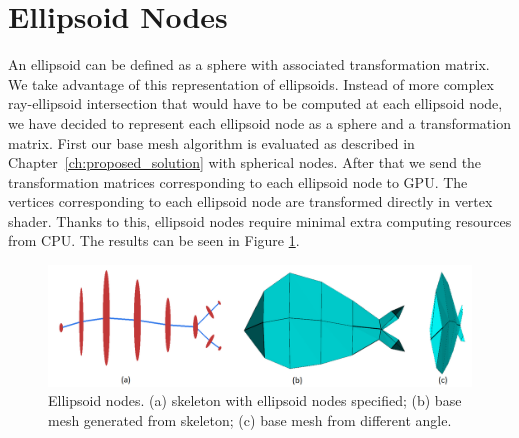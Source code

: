 \section{Ellipsoid Nodes}
An ellipsoid can be defined as a sphere with associated transformation matrix.
We take advantage of this representation of ellipsoids.
Instead of more complex ray-ellipsoid intersection that would have to be computed at each ellipsoid node, we have decided to represent each ellipsoid node as a sphere and a transformation matrix.
First our base mesh algorithm is evaluated as described in Chapter~\ref{ch:proposed_solution} with spherical nodes.
After that we send the transformation matrices corresponding to each ellipsoid node to GPU.
The vertices corresponding to each ellipsoid node are transformed directly in vertex shader.
Thanks to this, ellipsoid nodes require minimal extra computing resources from CPU.
The results can be seen in Figure \ref{fig:ellipsoid_ilu}.

\begin{figure}[ht]
    \centering
    \includegraphics[width=\linewidth]{images/ellipsoid_fish_ilu}
    \caption[Ellipsoid nodes]{Ellipsoid nodes. (a) skeleton with ellipsoid nodes specified; (b) base mesh generated from skeleton; (c) base mesh from different angle.}
    \label{fig:ellipsoid_ilu}
\end{figure}

